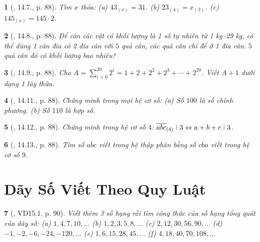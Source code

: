 \documentclass{article}
\newtheorem{baitoan}{}
\DeclareRobustCommand{\divby}{%
	\mathrel{\vbox{\baselineskip.65ex\lineskiplimit0pt\hbox{.}\hbox{.}\hbox{.}}}%
}
\begin{document}
\begin{baitoan}[\cite{TLCT_THCS_Toan_6_so_hoc}, 14.7., p. 88]
	Tìm $x$ thỏa: (a) $43_{(x)} = 31$. (b) $23_(4) = x_{(3)}$. (c) $145_{(x)} = 145\cdot2$.
\end{baitoan}

\begin{baitoan}[\cite{TLCT_THCS_Toan_6_so_hoc}, 14.8., p. 88]
	Để cân các vật có khối lượng là 1 số tự nhiên từ {\rm1 kg--29 kg}, có thể dùng 1 cân đĩa có 2 đĩa cân với $5$ quả cân, các quả cân chỉ để ở 1 đĩa cân. $5$ quả cân đó có khối lượng bao nhiêu?
\end{baitoan}

\begin{baitoan}[\cite{TLCT_THCS_Toan_6_so_hoc}, 14.9., p. 88]
	Cho $A = \sum_{i=0}^{20} 2^i = 1 + 2 + 2^2 + 2^3 + \cdots + 2^{20}$. Viết $A + 1$ dưới dạng 1 lũy thừa.
\end{baitoan}

\begin{baitoan}[\cite{TLCT_THCS_Toan_6_so_hoc}, 14.11., p. 88]
	Chứng minh trong mọi hệ cơ số: (a) Số $100$ là số chính phương. (b) Số $110$ là hợp số.
\end{baitoan}

\begin{baitoan}[\cite{TLCT_THCS_Toan_6_so_hoc}, 14.12., p. 88]
	Chứng minh trong hệ cơ số $4$: $\overline{abc}_{(4)}\divby3\Leftrightarrow a + b + c\divby3$.
\end{baitoan}

\begin{baitoan}[\cite{TLCT_THCS_Toan_6_so_hoc}, 14.13., p. 88]
	Tìm số $\overline{abc}$ viết trong hệ thập phân bằng số $\overline{cba}$ viết trong hệ cơ số $9$.
\end{baitoan}


\section{Dãy Số Viết Theo Quy Luật}

\begin{baitoan}[\cite{TLCT_THCS_Toan_6_so_hoc}, VD15.1, p. 90]
	Viết thêm 3 số hạng rồi tìm công thức của số hạng tổng quát của dãy số: (a) $1,4,7,10,\ldots$ (b) $1,2,3,5,8,\ldots$ (c) $2,12,30,56,90,\ldots$ (d) $-1,-2,-6,-24,-120,\ldots$ (e) $1,6,15,28,45,\ldots$ (f) $4,18,40,70,108,\ldots$
\end{baitoan}
\end{document}
